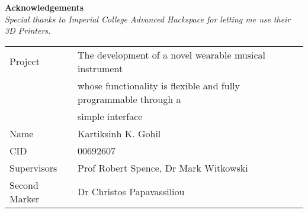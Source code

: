 
\vfill

\begin{center}

\textbf{Acknowledgements}\\
\textit{Special thanks to Imperial College Advanced Hackspace for letting me use their 3D Printers.}\\

\end{center}
\vspace{40 pt}

\large
\begin{tabular}{|l l}
Project & The development of a novel wearable musical instrument \\
& whose functionality is flexible and fully programmable through a \\ & simple interface \\
Name & Kartiksinh K. Gohil \\
CID & 00692607 \\
Supervisors & Prof Robert Spence, Dr Mark Witkowski \\
Second Marker & Dr Christos Papavassiliou 
\end{tabular}
\normalsize
\newpage